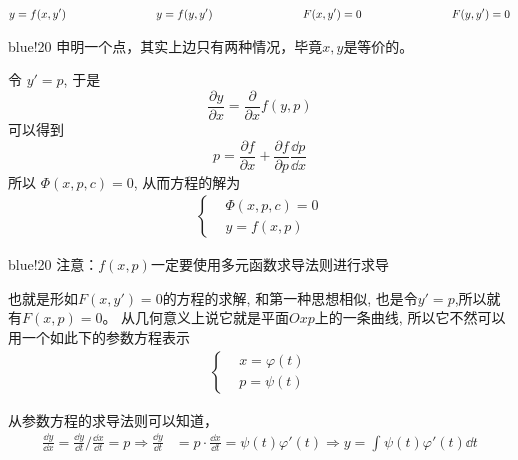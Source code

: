 \begin{framed}
    \begin{align*}
        y = f(x, y') \hspace*{8em} y = f(y, y') \hspace*{8em} F(x, y')= 0 \hspace*{8em} F(y, y')= 0
    \end{align*}
\end{framed}

\begin{formal}{blue!20}
  申明一个点，其实上边只有两种情况，毕竟$x, y$是等价的。  
\end{formal}



令 $y' = p$, 于是
\[
    \frac{\partial y}{\partial x} = \frac{\partial }{\partial x}f(y, p)
\]
可以得到
\[
p = \frac{\partial f}{\partial x}+\frac{\partial f}{\partial p}\frac{\dd p}{\dd x}
\]
所以 $\Phi(x, p, c)=0$,  从而方程的解为
\begin{align*}
    \left\{
        \begin{aligned}
            & \Phi(x, p, c) = 0 \\
            & y = f(x, p)
        \end{aligned}
    \right.
\end{align*}

\begin{formal}{blue!20}
    注意：$f(x, p)$一定要使用多元函数求导法则进行求导
\end{formal}


也就是形如$F(x, y')= 0$的方程的求解, 和第一种思想相似, 也是令$y'= p$,所以就有$F(x, p) = 0 $。
从几何意义上说它就是平面$Oxp$上的一条曲线, 所以它不然可以用一个如此下的参数方程表示
\begin{align*}
    \left\{
        \begin{aligned}
            & x = \varphi(t)\\
            & p = \psi(t)
        \end{aligned}
    \right.
\end{align*}

从参数方程的求导法则可以知道，
\begin{align*}
    \frac{\dd y}{\dd x} = {\frac{\dd y}{\dd t}}\bigg/{\frac{\dd x}{\dd t}} = p 
    \Longrightarrow  \frac{\dd y }{\dd t } &= p\cdot \frac{\dd x }{\dd t } = \psi(t) \varphi'(t)
    \Longrightarrow  y = \int_{}^{}{\psi (t ) \varphi' (t)\dd t}
\end{align*}


